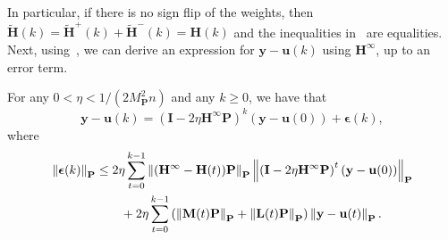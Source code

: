 In particular, if there is no sign flip of the weights, then $\tilde{\mathbf{H}}(k) = \tilde{\mathbf{H}}^+(k) + \tilde{\mathbf{H}}^-(k) = \mathbf{H}(k)$ and the inequalities in~ are equalities. Next, using~, we can derive an expression for $\mathbf{y} - \mathbf{u}(k)$ using $\mathbf{H}^\infty$, up to an error term.

\begin{lem}\label{lem.mainexpress}
For any $0 < \eta < 1/(2M_{\mathbf{P}}^2n)$ and any $k \geq 0$, we have that
\begin{equation} \label{eq:analytic_form}
\mathbf{y} - \mathbf{u}(k) = \left(\mathbf{I} - 2\eta \mathbf{H}^\infty\mathbf{P}\right)^k (\mathbf{y} - \mathbf{u}(0)) + \boldsymbol{\epsilon}(k),
\end{equation}
where
\begin{equation}\label{eq:epsilon_k_bound}
    \begin{aligned}
 \left\lVert\boldsymbol{\epsilon}(k)\right\rVert_{\mathbf{P}} &\leq 2\eta \sum_{t=0}^{k-1} \left\lVert(\mathbf{H}^\infty-\mathbf{H}(t))\mathbf{P}\right\rVert_{\mathbf{P}} \left\lVert\left(\mathbf{I} - 2\eta \mathbf{H}^\infty\mathbf{P}\right)^t (\mathbf{y} - \mathbf{u}(0))\right\rVert_{\mathbf{P}} \\
    &\qquad + 2\eta \sum_{t=0}^{k-1} \left(\left\lVert\mathbf{M}(t)\mathbf{P}\right\rVert_{\mathbf{P}} + \left\lVert\mathbf{L}(t)\mathbf{P}\right\rVert_{\mathbf{P}}\right) \left\lVert\mathbf{y} - \mathbf{u}(t)\right\rVert_{\mathbf{P}}. 
\end{aligned}
\end{equation}
\end{lem}

